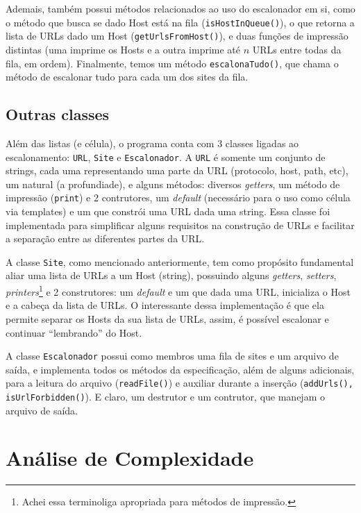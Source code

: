 \documentclass{article}
\def\code#1{\texttt{#1}}
\begin{document}
Ademais, também possui métodos relacionados ao uso do escalonador em si, como o método que busca se dado Host está na fila (\code{isHostInQueue()}), o que retorna a lista de URLs dado um Host (\code{getUrlsFromHost()}), e duas funções de impressão distintas (uma imprime os Hosts e a outra imprime até \( n \) URLs entre todas da fila, em ordem). Finalmente, temos um método \code{escalonaTudo()}, que chama o método de escalonar tudo para cada um dos sites da fila.

\subsection{Outras classes}

Além das listas (e célula), o programa conta com 3 classes ligadas ao escalonamento: \code{URL}, \code{Site} e \code{Escalonador}. A \code{URL} é somente um conjunto de strings, cada uma representando uma parte da URL (protocolo, host, path, etc), um natural (a profundiade), e alguns métodos: diversos \textit{getters}, um método de impressão (\code{print}) e 2 contrutores, um \textit{default} (necessário para o uso como célula via templates) e um que constrói uma URL dada uma string. Essa classe foi implementada para simplificar alguns requisitos na construção de URLs e facilitar a separação entre as diferentes partes da URL.

A classe \code{Site}, como mencionado anteriormente, tem como propósito fundamental aliar uma lista de URLs a um Host (string), possuindo alguns \textit{getters}, \textit{setters}, \textit{printers}\footnote{Achei essa terminoliga apropriada para métodos de impressão.} e 2 construtores: um \textit{default} e um que dada uma URL, inicializa o Host e a cabeça da lista de URLs. O interessante dessa implementação é que ela permite separar os Hosts da sua lista de URLs, assim, é possível escalonar e continuar ``lembrando'' do Host.

A classe \code{Escalonador} possui como membros uma fila de sites e um arquivo de saída, e implementa todos os métodos da especificação, além de alguns adicionais, para a leitura do arquivo (\code{readFile()}) e auxiliar durante a inserção (\code{addUrls(), isUrlForbidden()}). E claro, um destrutor e um contrutor, que manejam o arquivo de saída.

\section{Análise de Complexidade}
\end{document}

